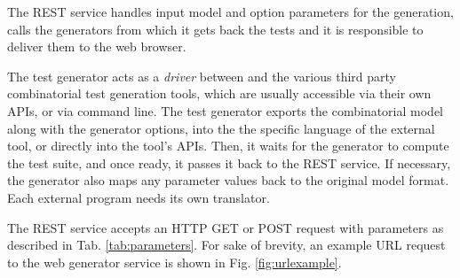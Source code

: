 \begin{tikzborder}{\cite{Gargantini16:validation}}
\begin{tikzborder}{\cite{gargantini_combinatorial_2017}}
\begin{tikzborder}{\cite{gargantini_combinatorial_2017}}
\begin{tikzborder}{\cite{garn2019}}
\begin{tikzborder}{\cite{arcaini2019achieving}}
\begin{tikzborder}{}
The REST service handles input model and option parameters for the generation, calls the generators from which it gets back the tests and it is responsible to deliver them to the web browser. 

The test generator acts as a \textit{driver} between \ctwedge and the various third party combinatorial test generation tools, which are usually accessible via their own APIs, or via command line. The test generator exports the combinatorial model along with the generator options, into the the specific language of the external tool, or directly into the tool's APIs. Then, it waits for the generator to compute the test suite, and once ready, it passes it back to the REST service. If necessary, the generator also maps any parameter values back to the original \ctwedge model format. Each external program needs its own translator.
\end{tikzborder}

\begin{table}[!htb]
	\caption{Request parameters to \ctwedge generation service}
	\centering
	\footnotesize
	\label{tab:parameters}
\end{table}

\begin{tikzborder}{}
The REST service accepts an HTTP GET or POST request with parameters as described in Tab. \ref{tab:parameters}.
For sake of brevity, an example URL request to the web generator service is shown in Fig. \ref{fig:urlexample}.
\end{tikzborder}


\end{tikzborder}
\end{tikzborder}
\end{tikzborder}
\end{tikzborder}
\end{tikzborder}
